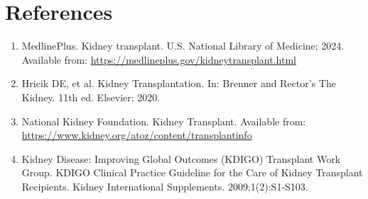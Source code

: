 \section*{References}
\begin{enumerate}
  \item MedlinePlus. Kidney transplant. U.S. National Library of Medicine; 2024. Available from: \url{https://medlineplus.gov/kidneytransplant.html}
  
  \item Hricik DE, et al. Kidney Transplantation. In: Brenner and Rector's The Kidney. 11th ed. Elsevier; 2020.
  
  \item National Kidney Foundation. Kidney Transplant. Available from: \url{https://www.kidney.org/atoz/content/transplantinfo}
  
  \item Kidney Disease: Improving Global Outcomes (KDIGO) Transplant Work Group. KDIGO Clinical Practice Guideline for the Care of Kidney Transplant Recipients. Kidney International Supplements. 2009;1(2):S1-S103.
\end{enumerate}

\clearpage
